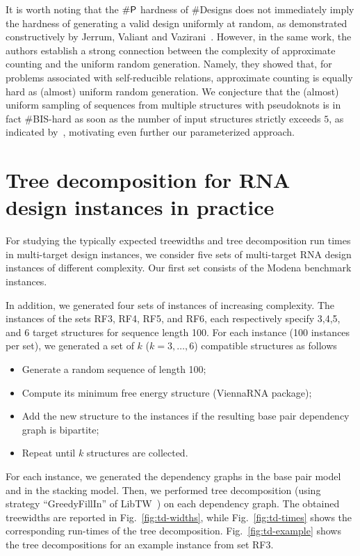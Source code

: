 \documentclass{bioinfo}
\newcommand{\NumDesign}{\ensuremath{\#}{\sf Designs}\xspace}
\begin{document}
It is worth noting that the $\#{\sf P}$ hardness of \NumDesign does not immediately imply the hardness of generating a valid design uniformly at random, as demonstrated constructively by Jerrum, Valiant and Vazirani~\citep{Jerrum1986}. However, in the same work, the authors establish a strong connection between the complexity of approximate counting and the uniform random generation. Namely, they showed that, for problems associated with self-reducible relations, approximate counting is equally hard as (almost) uniform random generation. We conjecture that the (almost) uniform sampling of sequences from multiple structures with pseudoknots is in fact \#{\sf BIS}-hard as soon as the number of input structures strictly exceeds $5$, as indicated by~\citet{Goldberg2004}, motivating even further our parameterized approach.

\section{Tree decomposition for RNA design instances in practice}
\label{appsec:treedecomp}

For studying the typically expected treewidths and tree decomposition
run times in multi-target design instances, we consider five sets of
multi-target RNA design instances of different complexity. Our first
set consists of the Modena benchmark instances.

In addition, we generated four sets of instances of increasing
complexity. The instances of the sets RF3, RF4, RF5, and RF6, each
respectively specify 3,4,5, and 6 target structures for sequence
length 100.  For each instance (100 instances per set), we generated a
set of $k$ ($k=3,\dots,6$) compatible structures as follows
\begin{itemize}
\item Generate a random sequence of length 100;
\item Compute its minimum free energy structure (ViennaRNA package);
\item Add the new structure to the instances if the resulting base pair dependency graph is bipartite;
\item Repeat until $k$ structures are collected.
\end{itemize}
For each instance, we generated the dependency graphs in the base pair
model and in the stacking model. Then, we performed tree decomposition
(using strategy ``GreedyFillIn'' of LibTW~\citep{Dijk2006}) on each dependency
graph. The obtained treewidths are reported in
Fig.~\ref{fig:td-widths}, while Fig.~\ref{fig:td-times} shows the
corresponding run-times of the tree decomposition.
Fig.~\ref{fig:td-example} shows the tree decompositions for an example
instance from set RF3.
\end{document}
